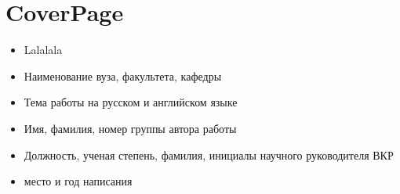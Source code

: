 \documentclass[11pt]{article}
\begin{document}
    \section*{CoverPage}
        \begin{itemize}
            \item Lalalala
            \item Наименование вуза, факультета, кафедры
            \item Тема работы на русском и английском языке
            \item Имя, фамилия, номер группы автора работы
            \item Должность, ученая степень, фамилия,
            инициалы научного руководителя ВКР
            \item место и год написания
        \end{itemize}
	
\end{document}

